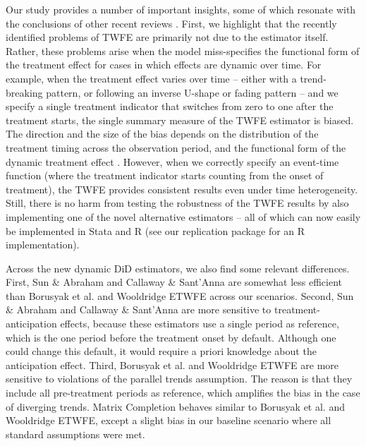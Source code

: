 Our study provides a number of important insights, some of which resonate with the conclusions of other recent reviews \cite[e.g.,][]{Chiu.2023,Freedman.2023,Roth.2023}. First, we highlight that the recently identified problems of TWFE are primarily not due to the estimator itself. Rather, these problems arise when the model miss-specifies the functional form of the treatment effect for cases in which effects are dynamic over time. For example, when the treatment effect varies over time -- either with a trend-breaking pattern, or following an inverse U-shape or fading pattern -- and we specify a single treatment indicator that switches from zero to one after the treatment starts, the single summary measure of the TWFE estimator is biased. The direction and the size of the bias depends on the distribution of the treatment timing across the observation period, and the functional form of the dynamic treatment effect \cite{Goodman-Bacon.2021}. However, when we correctly specify an event-time function (where the treatment indicator starts counting from the onset of treatment), the TWFE provides consistent results even under time heterogeneity. Still, there is no harm from testing the robustness of the TWFE results by also implementing one of the novel alternative estimators -- all of which can now easily be implemented in Stata and R (see our replication package for an R implementation).

Across the new dynamic DiD estimators, we also find some relevant differences. First, Sun \& Abraham and Callaway \& Sant'Anna are somewhat less efficient than Borusyak et al. and Wooldridge ETWFE across our scenarios. Second, Sun \& Abraham and Callaway \& Sant'Anna are more sensitive to treatment-anticipation effects, because these estimators use a single period as reference, which is the one period before the treatment onset by default. Although one could change this default, it would require a priori knowledge about the anticipation effect. Third, Borusyak et al. and Wooldridge ETWFE are more sensitive to violations of the parallel trends assumption. The reason is that they include all pre-treatment periods as reference, which amplifies the bias in the case of diverging trends. Matrix Completion behaves similar to Borusyak et al. and Wooldridge ETWFE, except a slight bias in our baseline scenario where all standard assumptions were met. 

